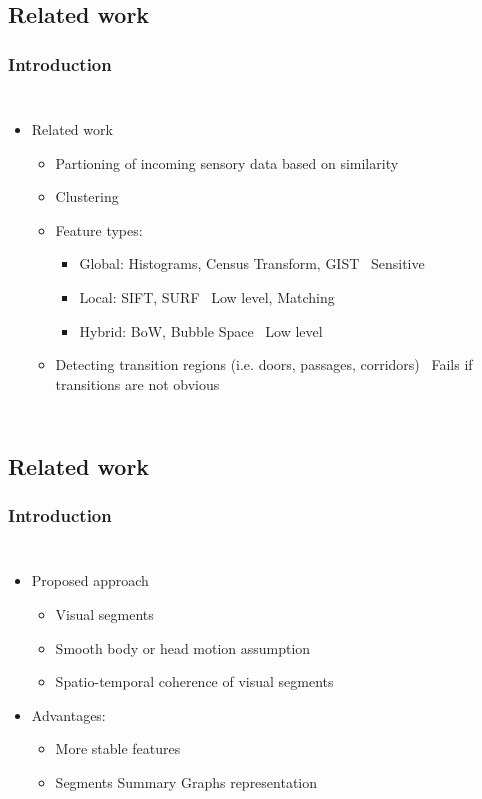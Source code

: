 \subsection{Related work}
\frame
{
	\frametitle{Introduction}
	
	\begin{columns}[t,onlytextwidth]
		\hspace*{-1cm}
		
		\vspace{-0.5cm}
		\begin{itemize}
			\item Related work
			\begin{itemize}
				\item Partioning of incoming sensory data based on similarity
				\item Clustering
				\item Feature types:
				\begin{itemize}
					\item Global: Histograms, Census Transform, GIST \textcolor{red}{\xmark} ~Sensitive
					\item Local: SIFT, SURF \textcolor{red}{\xmark} ~Low level, Matching
					\item Hybrid: BoW, Bubble Space \textcolor{red}{\xmark} ~Low level
				\end{itemize}
			\item Detecting transition regions (i.e. doors, passages, corridors) \textcolor{red}{\xmark} ~Fails if transitions are not obvious 
				
				
			\end{itemize}
			
		\end{itemize}
	\end{columns}
}
\subsection{Related work}
\frame
{
	\frametitle{Introduction}
	
	\begin{columns}[t,onlytextwidth]
		\hspace*{-1cm}
		
		\vspace{-0.5cm}
		\begin{itemize}
			\item Proposed approach
			\begin{itemize}
				\item Visual segments
				\item Smooth body or head motion assumption
				\item Spatio-temporal coherence of visual segments
			\end{itemize}
			
			\item Advantages:
			\begin{itemize}
				\item More stable features
				\item Segments Summary Graphs representation
			\end{itemize}
			
		\end{itemize}
	\end{columns}
}
